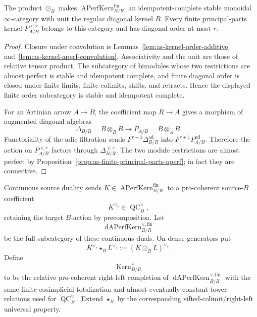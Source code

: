 \begin{proposition}
\label{prop:as-finite-kernel-monoidal}
The product $\odot_B$ makes
$\operatorname{APerfKern}^{\mathrm{fin}}_{B/R}$ an idempotent-complete stable
monoidal $\infty$-category with unit the regular diagonal kernel $B$.  Every
finite principal-parts kernel $P_{A/B}^{\leq r}$ belongs to this category and
has diagonal order at most $r$.
\end{proposition}

\begin{proof}
Closure under convolution is
Lemmas~\ref{lem:as-kernel-order-additive} and~\ref{lem:as-kernel-aperf-convolution}.
Associativity and the unit are those of relative tensor product.  The
subcategory of bimodules whose two restrictions are almost perfect is stable
and idempotent complete, and finite diagonal order is closed under finite
limits, finite colimits, shifts, and retracts.  Hence the displayed finite
order subcategory is stable and idempotent complete.

For an Artinian arrow $A\to B$, the coefficient map $R\to A$ gives a morphism
of augmented diagonal algebras
\[
    \Delta_{B/R}=B\otimes_RB
    \longrightarrow
    P_{A/B}=B\otimes_AB.
\]
Functoriality of the adic filtration sends
$F^{r+1}\Delta_{B/R}^{\mathrm{ad}}$ into
$F^{r+1}P_{A/B}^{\mathrm{ad}}$.  Therefore the action on
$P_{A/B}^{\leq r}$ factors through $\Delta_{B/R}^{\leq r}$.  The two module
restrictions are almost perfect by
Proposition~\ref{prop:as-finite-principal-parts-aperf}; in fact they are
connective.
\end{proof}

\begin{construction}
\label{con:as-procoherent-kernel-category}
Continuous source duality sends
$K\in\operatorname{APerfKern}^{\mathrm{fin}}_{B/R}$ to a pro-coherent
source-$B$ coefficient
\[
    K^{\vee_s}\in\operatorname{QC}^{\vee}_B,
\]
retaining the target $B$-action by precomposition.  Let
\[
    \operatorname{dAPerfKern}^{\vee,\mathrm{fin}}_{B/R}
\]
be the full subcategory of these continuous duals.  On dense generators put
\[
\boxed{
    K^{\vee_s}\star_BL^{\vee_s}
    :=
    (K\odot_BL)^{\vee_s}.
}
\]
Define
\[
\boxed{
    \operatorname{Kern}^{\vee}_{B/R}
}
\]
to be the relative pro-coherent right-left completion of
$\operatorname{dAPerfKern}^{\vee,\mathrm{fin}}_{B/R}$ with the same finite
cosimplicial-totalization and almost-eventually-constant tower relations used
for $\operatorname{QC}^{\vee}_B$.  Extend $\star_B$ by the corresponding
sifted-colimit/right-left universal property.
\end{construction}

